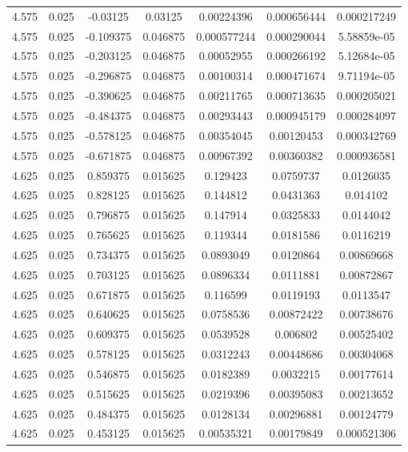 \begin{flushleft}
\begin{longtable}{ccccccc}
4.575 & 0.025 & -0.03125 & 0.03125 & 0.00224396 & 0.000656444 & 0.000217249  \\ 
4.575 & 0.025 & -0.109375 & 0.046875 & 0.000577244 & 0.000290044 & 5.58859e-05  \\ 
4.575 & 0.025 & -0.203125 & 0.046875 & 0.00052955 & 0.000266192 & 5.12684e-05  \\ 
4.575 & 0.025 & -0.296875 & 0.046875 & 0.00100314 & 0.000471674 & 9.71194e-05  \\ 
4.575 & 0.025 & -0.390625 & 0.046875 & 0.00211765 & 0.000713635 & 0.000205021  \\ 
4.575 & 0.025 & -0.484375 & 0.046875 & 0.00293443 & 0.000945179 & 0.000284097  \\ 
4.575 & 0.025 & -0.578125 & 0.046875 & 0.00354045 & 0.00120453 & 0.000342769  \\ 
4.575 & 0.025 & -0.671875 & 0.046875 & 0.00967392 & 0.00360382 & 0.000936581  \\ 
4.625 & 0.025 & 0.859375 & 0.015625 & 0.129423 & 0.0759737 & 0.0126035  \\ 
4.625 & 0.025 & 0.828125 & 0.015625 & 0.144812 & 0.0431363 & 0.014102  \\ 
4.625 & 0.025 & 0.796875 & 0.015625 & 0.147914 & 0.0325833 & 0.0144042  \\ 
4.625 & 0.025 & 0.765625 & 0.015625 & 0.119344 & 0.0181586 & 0.0116219  \\ 
4.625 & 0.025 & 0.734375 & 0.015625 & 0.0893049 & 0.0120864 & 0.00869668  \\ 
4.625 & 0.025 & 0.703125 & 0.015625 & 0.0896334 & 0.0111881 & 0.00872867  \\ 
4.625 & 0.025 & 0.671875 & 0.015625 & 0.116599 & 0.0119193 & 0.0113547  \\ 
4.625 & 0.025 & 0.640625 & 0.015625 & 0.0758536 & 0.00872422 & 0.00738676  \\ 
4.625 & 0.025 & 0.609375 & 0.015625 & 0.0539528 & 0.006802 & 0.00525402  \\ 
4.625 & 0.025 & 0.578125 & 0.015625 & 0.0312243 & 0.00448686 & 0.00304068  \\ 
4.625 & 0.025 & 0.546875 & 0.015625 & 0.0182389 & 0.0032215 & 0.00177614  \\ 
4.625 & 0.025 & 0.515625 & 0.015625 & 0.0219396 & 0.00395083 & 0.00213652  \\ 
4.625 & 0.025 & 0.484375 & 0.015625 & 0.0128134 & 0.00296881 & 0.00124779  \\ 
4.625 & 0.025 & 0.453125 & 0.015625 & 0.00535321 & 0.00179849 & 0.000521306  \\ 

\end{longtable}
\end{flushleft}
